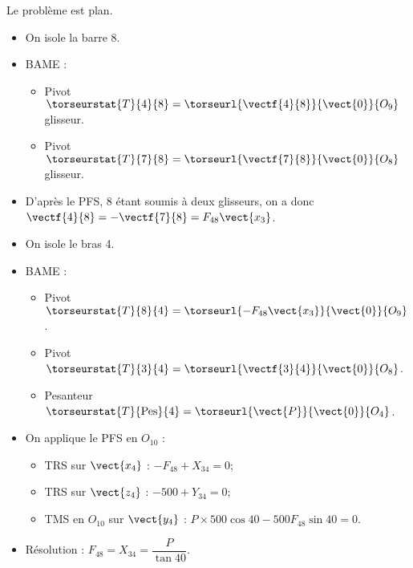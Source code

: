 \ifprof
\begin{corrige}
Le problème est plan. 
\begin{itemize}
\item On isole la barre 8.
\item BAME : 
\begin{itemize}
\item Pivot $\torseurstat{T}{4}{8} = \torseurl{\vectf{4}{8}}{\vect{0}}{O_9}$ glisseur.
\item Pivot $\torseurstat{T}{7}{8} = \torseurl{\vectf{7}{8}}{\vect{0}}{O_8}$ glisseur.
\end{itemize}
\item D'après le PFS, 8 étant soumis à deux glisseurs, on a donc $\vectf{4}{8}=-\vectf{7}{8}=F_{48} \vect{x_3}$.
\end{itemize}

\vspace{.5cm}

\begin{itemize}
\item On isole le bras 4.
\item BAME : 
\begin{itemize}
\item Pivot $\torseurstat{T}{8}{4} = \torseurl{-F_{48}\vect{x_3} }{\vect{0}}{O_9}$.
\item Pivot $\torseurstat{T}{3}{4} = \torseurl{\vectf{3}{4}}{\vect{0}}{O_8}$.
\item Pesanteur $\torseurstat{T}{\text{Pes}}{4} = \torseurl{\vect{P}}{\vect{0}}{O_4}$.
\end{itemize}
\item On applique le PFS en $O_{10}$ :
\begin{itemize}
\item TRS sur $\vect{x_4}$ : $-F_{48}+X_{34} = 0$;
\item TRS sur $\vect{z_4}$ : $-500+Y_{34} = 0$;
\item TMS en $O_{10}$ sur $\vect{y_4}$ : $P\times 500 \cos 40 -500F_{48} \sin 40 = 0$.
\end{itemize}  
\item Résolution : $F_{48} =  X_{34} = \dfrac{P}{\tan 40} $.
\end{itemize}
\end{corrige}
\else
\fi

